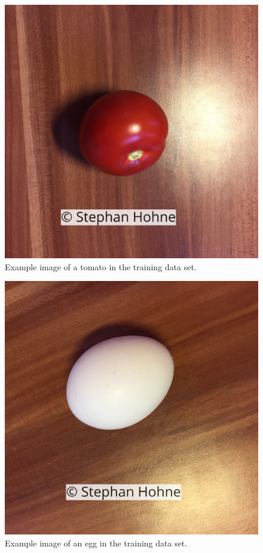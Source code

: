 \documentclass[10pt, journal, compsoc]{IEEEtran}
\begin{document}
\begin{figure}[htpb]
      \centering
      \includegraphics[width=\columnwidth]{images/data_samples/IMG_1482.jpg}
      \caption{Example image of a tomato in the training data set.}
      \label{fig:IMG_1482}
\end{figure}
\begin{figure}[htpb]
      \centering
      \includegraphics[width=\columnwidth]{images/data_samples/IMG_1565.jpg}
      \caption{Example image of an egg in the training data set.}
      \label{fig:IMG_1565}
\end{figure}
\end{document}
